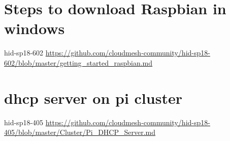 \section{Steps to download Raspbian in windows}
hid-sp18-602
\url{https://github.com/cloudmesh-community/hid-sp18-602/blob/master/getting_started_raspbian.md}

\section{dhcp server on pi cluster}
hid-sp18-405 
\url{https://github.com/cloudmesh-community/hid-sp18-405/blob/master/Cluster/Pi_DHCP_Server.md}

